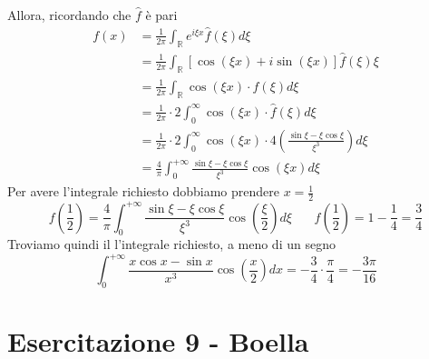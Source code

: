 Allora, ricordando che $\hat{f}$ è pari
\begin{align*}
f( x) & =\frac{1}{2\pi }\int _{\mathbb{R}} e^{i\xi x}\hat{f}( \xi ) d\xi \\
 & =\frac{1}{2\pi }\int _{\mathbb{R}}[\cos( \xi x) +i\sin( \xi x)]\hat{f}( \xi ) \xi \\
 & =\frac{1}{2\pi }\int _{\mathbb{R}}\cos( \xi x) \cdotp \hat{f}( \xi ) d\xi \\
 & =\frac{1}{2\pi } \cdotp 2\int ^{\infty }_{0}\cos( \xi x) \cdotp \hat{f}( \xi ) d\xi \\
 & =\frac{1}{2\pi } \cdotp 2\int ^{\infty }_{0}\cos( \xi x) \cdotp 4\left(\frac{\sin \xi -\xi \cos \xi }{\xi ^{3}}\right) d\xi \\
 & =\frac{4}{\pi }\int ^{+\infty }_{0}\frac{\sin \xi -\xi \cos \xi }{\xi ^{3}}\cos( \xi x) d\xi 
\end{align*}
Per avere l'integrale richiesto dobbiamo prendere $x=\frac{1}{2}$
\begin{equation*}
f\left(\frac{1}{2}\right) =\frac{4}{\pi }\int ^{+\infty }_{0}\frac{\sin \xi -\xi \cos \xi }{\xi ^{3}}\cos\left(\frac{\xi }{2}\right) d\xi \ \ \ \ \ \ \ \ f\left(\frac{1}{2}\right) =1-\frac{1}{4} =\frac{3}{4}
\end{equation*}
Troviamo quindi il l'integrale richiesto, a meno di un segno
\begin{equation*}
\int ^{+\infty }_{0}\frac{x\cos x-\sin x}{x^{3}}\cos\left(\frac{x}{2}\right) dx=-\frac{3}{4} \cdotp \frac{\pi }{4} =-\frac{3\pi }{16}
\end{equation*}
\chapter{Esercitazione 9 - Boella}
\ParteEsercizi

